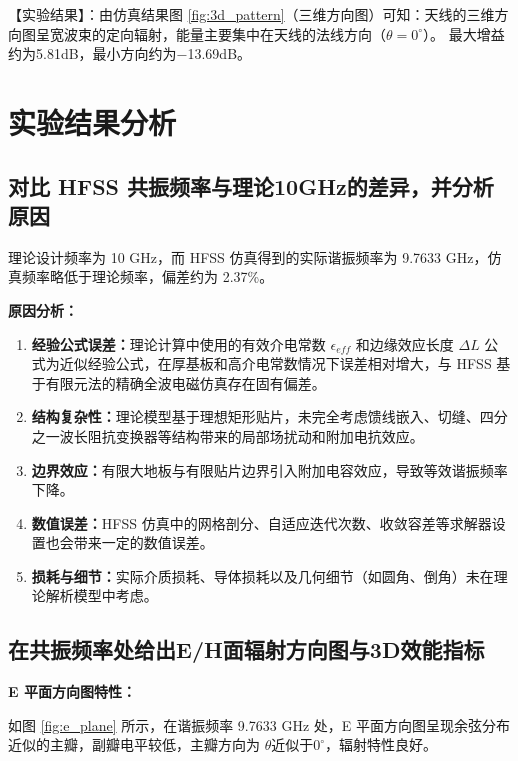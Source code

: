 \documentclass[12pt,a4paper,UTF8]{article}
\begin{document}
【实验结果】：由仿真结果图 \ref{fig:3d_pattern}（三维方向图）可知：天线的三维方向图呈宽波束的定向辐射，能量主要集中在天线的法线方向（$\theta=0^\circ$）。
最大增益约为5.81dB，最小方向约为−13.69dB。

\section{实验结果分析}

\subsection{对比 HFSS 共振频率与理论10GHz的差异，并分析原因}

理论设计频率为 10 GHz，而 HFSS 仿真得到的实际谐振频率为 9.7633 GHz，仿真频率略低于理论频率，偏差约为 2.37\%。

\textbf{原因分析：}

\begin{enumerate}
    \item \textbf{经验公式误差：}理论计算中使用的有效介电常数 $\epsilon_{eff}$ 和边缘效应长度 $\Delta L$ 公式为近似经验公式，在厚基板和高介电常数情况下误差相对增大，与 HFSS 基于有限元法的精确全波电磁仿真存在固有偏差。
    
    \item \textbf{结构复杂性：}理论模型基于理想矩形贴片，未完全考虑馈线嵌入、切缝、四分之一波长阻抗变换器等结构带来的局部场扰动和附加电抗效应。
    
    \item \textbf{边界效应：}有限大地板与有限贴片边界引入附加电容效应，导致等效谐振频率下降。
    
    \item \textbf{数值误差：}HFSS 仿真中的网格剖分、自适应迭代次数、收敛容差等求解器设置也会带来一定的数值误差。
    
    \item \textbf{损耗与细节：}实际介质损耗、导体损耗以及几何细节（如圆角、倒角）未在理论解析模型中考虑。
\end{enumerate}

\subsection{在共振频率处给出E/H面辐射方向图与3D效能指标}

\textbf{E 平面方向图特性：}

如图 \ref{fig:e_plane} 所示，在谐振频率 9.7633 GHz 处，E 平面方向图呈现余弦分布近似的主瓣，副瓣电平较低，主瓣方向为 $\theta$近似于$0^\circ$，辐射特性良好。
\end{document}
